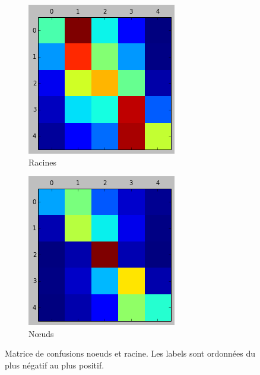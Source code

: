 \documentclass[conference]{IEEEtran}
\begin{document}
\begin{figure}[h]
\begin{subfigure}{0.48\columnwidth}
\includegraphics[width=\textwidth]{fig/CMLastTrainRoot.png}
\caption{Racines}
\end{subfigure}
\begin{subfigure}{0.48\columnwidth}
\includegraphics[width=\textwidth]{fig/CMLastTrain.png}
\caption{Nœuds}
\end{subfigure}
\caption{Matrice de confusions noeuds et racine. Les labels sont ordonnées du plus négatif au plus positif.}
\label{CM1}
\end{figure}
\end{document}
